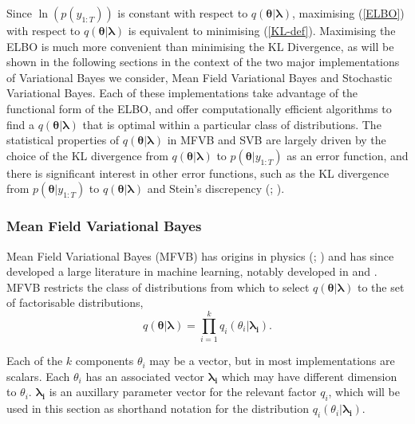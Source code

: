 \documentclass[12pt,a4paper]{article}%
\numberwithin{equation}{section}
\begin{document}
Since $\ln(p(y_{1:T}))$ is constant with respect to $q(\boldsymbol{\theta} | \boldsymbol{\lambda})$, maximising (\ref{ELBO}) with respect to $q(\boldsymbol{\theta} | \boldsymbol{\lambda})$ is equivalent to minimising (\ref{KL-def}). Maximising the ELBO is much more convenient than minimising the KL Divergence, as will be shown in the following sections in the context of the two major implementations of Variational Bayes we consider, Mean Field Variational Bayes and Stochastic Variational Bayes. Each of these implementations take advantage of the functional form of the ELBO, and offer computationally efficient algorithms to find a $q(\boldsymbol{\theta} | \boldsymbol{\lambda})$ that is optimal within a particular class of distributions. The statistical properties of $q(\boldsymbol{\theta} | \boldsymbol{\lambda})$ in MFVB and SVB are largely driven by the choice of the KL divergence from $q(\boldsymbol{\theta} | \boldsymbol{\lambda})$ to $p(\boldsymbol{\theta} | y_{1:T})$ as an error function, and there is significant interest in other error functions, such as the KL divergence from $p(\boldsymbol{\theta} | y_{1:T})$ to $q(\boldsymbol{\theta} | \boldsymbol{\lambda})$ \citep{Minka2001} and Stein's discrepency (\citealp{Liu2016}; \citealp{Ranganath2016b}).

\subsubsection{Mean Field Variational Bayes} \label{sec:mfvb}

Mean Field Variational Bayes (MFVB) has origins in physics (\citealp{Amari1985}; \citealp{Chandler1987}) and has since developed a large literature in machine learning, notably developed in \citet{Jordan1999} and \citet{Ghahramani2000}. MFVB restricts the class of distributions from which to select $q(\boldsymbol{\theta} | \boldsymbol{\lambda})$ to the set of factorisable distributions,
\begin{equation}
\label{mf1}
q(\boldsymbol{\theta} | \boldsymbol{\lambda}) = \prod_{i=1}^k q_i(\theta_i | \boldsymbol{\lambda_i}).
\end{equation}

Each of the $k$ components $\theta_i$ may be a vector, but in most implementations are scalars. Each $\theta_i$ has an associated vector $\boldsymbol{\lambda_i}$ which may have different dimension to $\theta_i$. $\boldsymbol{\lambda_i}$ is an auxillary parameter vector for the relevant factor $q_i$, which will be used in this section as shorthand notation for the distribution $q_i(\theta_i |\boldsymbol{\lambda_i})$. 
\end{document}
